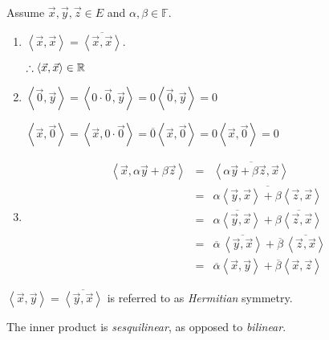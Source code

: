 \documentclass[letterpaper,12pt,fleqn]{article}
\newcommand{\F}{\mathbb{F}}
\newcommand{\inner}[2]{\left<#1,#2\right>}
\newcommand{\conj}[1]{\overline{#1}}
\newcommand{\vx}{\vec{x}}
\newcommand{\vy}{\vec{y}}
\newcommand{\vz}{\vec{z}}
\newcommand{\vo}{\vec{0}}
\renewcommand{\a}{\alpha}
\renewcommand{\b}{\beta}
\begin{document}
\begin{theproof}
  Assume $\vx,\vy,\vz\in E$ and $\a,\b\in\F$.
  \begin{enumerate}
  \item

    $\inner{\vx}{\vx}=\conj{\inner{\vx}{\vx}}$.

    $\therefore\inner{\vx}{\vx}\in\R$

  \item

    $\inner{\vo}{\vy}=\inner{0\cdot\vo}{\vy}=0\inner{\vo}{\vy}=0$

    $\inner{\vx}{\vo}=\inner{\vx}{0\cdot\vo}=\conj{0}\inner{\vx}{\vo}=
    0\inner{\vx}{\vo}=0$
    
  \item

    \begin{eqnarray*}
    \inner{\vx}{\a\vy+\b\vz} &=& \conj{\inner{\a\vy+\b\vz}{\vx}} \\
    &=& \conj{\a\inner{\vy}{\vx}+\b\inner{\vz}{\vx}} \\
    &=& \conj{\a\inner{\vy}{\vx}}+\conj{\b\inner{\vz}{\vx}} \\
    &=& \conj{\a}\,\conj{\inner{\vy}{\vx}}+\conj{\b}\,\conj{\inner{\vz}{\vx}} \\
    &=& \conj{\a}\inner{\vx}{\vy}+\conj{\b}\inner{\vx}{\vz}
  \end{eqnarray*}
  \end{enumerate}
\end{theproof}

$\inner{\vx}{\vy}=\conj{\inner{\vy}{\vx}}$ is referred to as \emph{Hermitian}
symmetry.

The inner product is \emph{sesquilinear}, as opposed to \emph{bilinear}.
\end{document}

